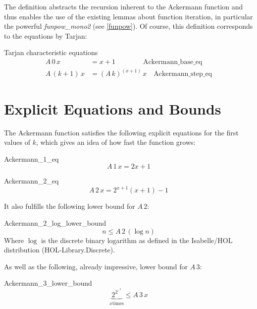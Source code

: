 \documentclass[headsepline,footsepline,footinclude=false,oneside,fontsize=11pt,paper=a4,listof=totoc,bibliography=totoc]{scrbook} %
\begin{document}
The definition abstracts the recursion inherent to the Ackermann function and thus enables the use of the existing lemmas about function iteration, in particular the powerful \textit{funpow\_mono2} (see \ref{funpow}). Of course, this definition corresponds to the equations by Tarjan:

\begin{lemma}{Tarjan characteristic equations}
	\begin{align}
	A \, 0 \, x &= x + 1 \quad \quad \quad \quad \text{Ackermann\_base\_eq} \\
	A \, (k + 1)\, x &= (A\, k)^{(x + 1)}\, x \quad \text{Ackermann\_step\_eq}
	\end{align}
\end{lemma}

\section{Explicit Equations and Bounds}

The Ackermann function satisfies the following explicit equations for the first values of $k$, which gives an idea of how fast the function grows:

\begin{lemma}{Ackermann\_1\_eq}
	\begin{equation}
	A \, 1 \, x = 2x + 1
	\end{equation}
\end{lemma}

\begin{lemma}{Ackermann\_2\_eq}
	\begin{equation}
	A \, 2 \, x = 2^{x+1} (x + 1) - 1
	\end{equation}
\end{lemma}

It also fulfills the following lower bound for $A\,2$:

\begin{lemma}{Ackermann\_2\_log\_lower\_bound}
	\begin{equation}
		n \leq A \, 2 \, (\log{n})
	\end{equation}
	Where $\log$ is the discrete binary logarithm as defined in the Isabelle/HOL distribution (HOL-Library.Discrete).
\end{lemma}

As well as the following, already impressive, lower bound for $A\,3$:

\begin{lemma}{Ackermann\_3\_lower\_bound}
	\begin{equation}
	\underbrace{2^{2^{\iddots^{2}}}}_{x \text{times}} \leq A \, 3 \, x
	\end{equation}
\end{lemma}
\end{document}
